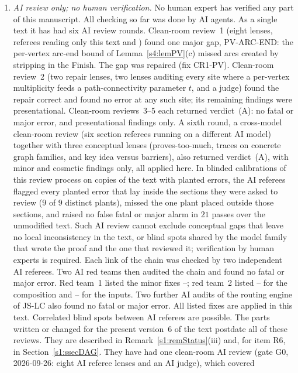 \begin{enumerate}
\item \emph{AI review only; no human verification.} No human expert has
verified any part of this manuscript. All checking so far was done by AI agents.
As a single text it has had six AI review rounds. Clean-room review~1
(eight lenses, referees reading only this text and \cite{BM}) found one major
gap, PV-ARC-END: the per-vertex arc-end bound of Lemma~\ref{s4:lemPV}(c) missed
arcs created by stripping in the Finish. The gap was repaired (fix
\textsf{CR1-PV}). Clean-room review~2 (two repair lenses, two lenses auditing
every site where a per-vertex multiplicity feeds a path-connectivity parameter
$t$, and a judge) found the repair correct and found no error at any such site;
its remaining findings were presentational. Clean-room reviews~3--5 each
returned verdict~(A): no fatal or major error, and presentational findings
only. A sixth round, a cross-model clean-room review (six section referees
running on a different AI model) together with three conceptual lenses
(proves-too-much, traces on concrete graph families, and key idea versus
barriers), also returned verdict~(A), with minor and cosmetic findings only,
all applied here. In blinded calibrations of this review process on copies of the text with
planted errors, the AI referees flagged every planted error that lay inside the
sections they were asked to review ($9$ of $9$ distinct plants), missed the one
plant placed outside those sections, and raised no false fatal or major alarm
in $21$ passes over the unmodified text.
Such AI review cannot exclude conceptual gaps that leave no local
inconsistency in the text, or blind spots shared by the model family that wrote
the proof and the one that reviewed it; verification by human experts is
required. Each link of
the chain was checked by two independent AI referees. Two AI red teams then
audited the chain and found no fatal or major error. Red team~1 listed the minor
fixes --; red team~2 listed -- for the
composition and -- for the inputs. Two further AI audits of the
routing engine of JS-LC also found no fatal or major error. All listed fixes are
applied in this text. Correlated blind spots between AI referees are possible.
The parts written or changed for the present version~6 of the text postdate
all of these reviews. They are described in Remark~\ref{s1:remStatus}(iii) and,
for item R6, in Section~\ref{s1:ssecDAG}. They have had one clean-room AI review
(gate G0, 2026-09-26: eight AI referee lenses and an AI judge), which covered

\end{enumerate}
